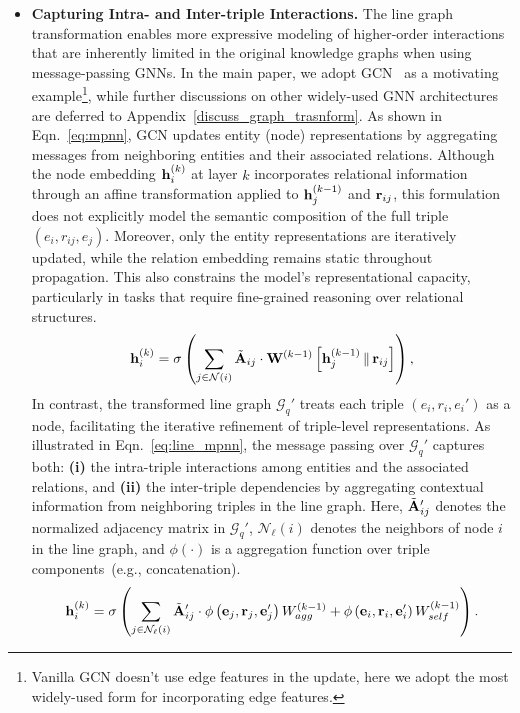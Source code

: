 \documentclass{article}
\theoremstyle{plain}
\theoremstyle{definition}
\theoremstyle{remark}
\newcommand{\tb}[1]{\textbf{#1}}
\newcommand{\mcal}[1]{\mathcal{#1}}
\begin{document}
\begin{itemize}[leftmargin=*]
    \item[\ding{182}] \textbf{Capturing Intra- and Inter-triple Interactions.}
    The line graph transformation enables more expressive modeling of higher-order interactions that are inherently limited in the original knowledge graphs when using message-passing GNNs. In the main paper, we adopt GCN~\cite{kipf2016semi} as a motivating example\footnote{Vanilla GCN doesn't use edge features in the update, here we adopt the most widely-used form for incorporating edge features.}, while further discussions on other widely-used GNN architectures are deferred to Appendix~\ref{discuss_graph_trasnform}. As shown in Eqn.~\ref{eq:mpnn}, GCN updates entity (node) representations by aggregating messages from neighboring entities and their associated relations. Although the node embedding ${\mathbf{h}}_i^{(k)}$ at layer $k$ incorporates relational information through an affine transformation applied to ${\mathbf{h}}_j^{(k-1)}$ and ${\mathbf{r}}_{ij}$, this formulation does not explicitly model the semantic composition of the full triple $(e_i, r_{ij}, e_j)$. Moreover, only the entity representations are iteratively updated, while the relation embedding remains static throughout propagation. This also constrains the model’s representational capacity, particularly in tasks that require fine-grained reasoning over relational structures.
    \begin{equation}
    \label{eq:mpnn}
    {\mathbf{h}}_i^{(k)} = \sigma \left( \sum_{j \in \mathcal{N}(i)} \tilde{{\mathbf{A}}}_{ij} \cdot \mathbf{W}^{(k-1)} \left[ {\mathbf{h}}_j^{(k-1)} \, \| \, {\mathbf{r}}_{ij} \right] \right),
    \end{equation}
    In contrast, the transformed line graph $\mcal{G}_q'$ treats each triple $(e_i, r_i, e_i')$ as a node, facilitating the iterative refinement of triple-level representations. As illustrated in Eqn.~\ref{eq:line_mpnn}, the message passing over $\mcal{G}_q'$ captures both: \tb{(i)} the intra-triple interactions among entities and the associated relations, and \tb{(ii)} the inter-triple dependencies by aggregating contextual information from neighboring triples in the line graph. Here, $\tilde{{\mathbf{A}}}'_{ij}$ denotes the normalized adjacency matrix in $\mcal{G}_q'$, $\mcal{N}_\ell(i)$ denotes the neighbors of node $i$ in the line graph, and $\phi(\cdot)$ is a aggregation function over triple components~(e.g., concatenation).
    \begin{equation}
    \label{eq:line_mpnn}
    \rvh_i^{(k)} = \sigma\left( \sum_{j \in \mathcal{N}_\ell(i)} \tilde{\rmA}_{ij}^\prime \cdot \phi\left(\mathbf{e}_j, \mathbf{r}_j, \mathbf{e}_j'\right) W_{agg}^{(k-1)} + \phi\left(\mathbf{e}_i, \mathbf{r}_i, \mathbf{e}_i'\right) W_{self}^{(k-1)} \right).

\end{equation}
\end{itemize}
\end{document}
